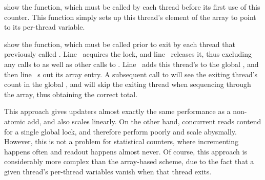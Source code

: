 \begin{fcvref}
 show the 
function, which
must be called by each thread before its first use of this counter.
This function simply sets up this thread's element of the 
array to point to its per-thread  variable.
\end{fcvref}

\QuickQuizEnd

\begin{fcvref}
 show the 
function, which
must be called prior to exit by each thread that previously called
.
Line~ acquires the lock, and
line~ releases it, thus excluding any
calls to  as well as other calls to
.
Line~ adds this thread's  to the global
,
and then line~ s out its  array entry.
A subsequent call to  will see the exiting thread's
count in the global , and will skip the exiting thread
when sequencing through the  array, thus obtaining
the correct total.
\end{fcvref}

This approach gives updaters almost exactly the same performance as
a non-atomic add, and also scales linearly.
On the other hand, concurrent reads contend for a single global lock,
and therefore perform poorly and scale abysmally.
However, this is not a problem for statistical counters, where incrementing
happens often and readout happens almost never.
Of course, this approach is considerably more complex than the
array-based scheme, due to the fact that a given thread's per-thread
variables vanish when that thread exits.


